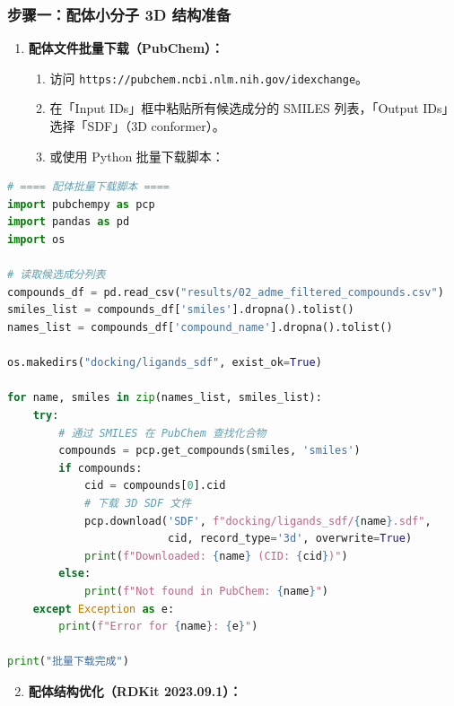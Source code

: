 \documentclass[12pt,a4paper,twoside]{article}
\begin{document}
\subsubsection{步骤一：配体小分子 3D 结构准备}

\begin{enumerate}
  \item \textbf{配体文件批量下载（PubChem）：}
    \begin{enumerate}
      \item 访问 \texttt{https://pubchem.ncbi.nlm.nih.gov/idexchange}。
      \item 在「Input IDs」框中粘贴所有候选成分的 SMILES 列表，「Output IDs」选择「SDF」（3D conformer）。
      \item 或使用 Python 批量下载脚本：
    \end{enumerate}
\end{enumerate}

\begin{lstlisting}[language=Python,caption={批量下载配体 3D 结构（Python）}]
# ==== 配体批量下载脚本 ====
import pubchempy as pcp
import pandas as pd
import os

# 读取候选成分列表
compounds_df = pd.read_csv("results/02_adme_filtered_compounds.csv")
smiles_list = compounds_df['smiles'].dropna().tolist()
names_list = compounds_df['compound_name'].dropna().tolist()

os.makedirs("docking/ligands_sdf", exist_ok=True)

for name, smiles in zip(names_list, smiles_list):
    try:
        # 通过 SMILES 在 PubChem 查找化合物
        compounds = pcp.get_compounds(smiles, 'smiles')
        if compounds:
            cid = compounds[0].cid
            # 下载 3D SDF 文件
            pcp.download('SDF', f"docking/ligands_sdf/{name}.sdf",
                         cid, record_type='3d', overwrite=True)
            print(f"Downloaded: {name} (CID: {cid})")
        else:
            print(f"Not found in PubChem: {name}")
    except Exception as e:
        print(f"Error for {name}: {e}")

print("批量下载完成")
\end{lstlisting}

\begin{enumerate}
  \setcounter{enumi}{1}
  \item \textbf{配体结构优化（RDKit 2023.09.1）：}
\end{enumerate}
\end{document}
